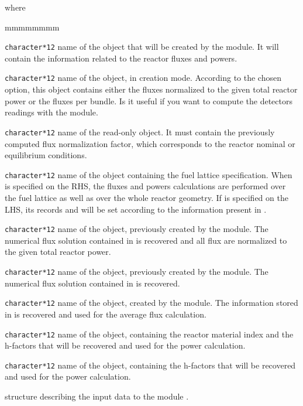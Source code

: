 \noindent where

\begin{ListeDeDescription}{mmmmmmmm}

\item[\dusa{POWER}] \texttt{character*12} name of the  object
that will be created by the module. It will contain the information related to the
reactor fluxes and powers.

\item[\dusa{NRMFLUX}] \texttt{character*12} name of the  object,
in creation mode. According to the chosen option, this object contains either 
the fluxes normalized to the given total reactor power or the fluxes per bundle. 
Is it useful if you want to compute the detectors readings with the  module.

\item[\dusa{POWOLD}] \texttt{character*12} name of the read-only 
object. It must contain the previously computed flux normalization factor, which
corresponds to the reactor nominal or equilibrium conditions.

\item[\dusa{FMAP}] \texttt{character*12} name of the  object
containing the fuel lattice specification. When  is specified on the RHS,
the fluxes and powers calculations are performed over the fuel lattice as well
as over the whole reactor geometry. If  is specified on the LHS, its
records  and  will be set according to the
information present in .

\item[\dusa{FLUX}] \texttt{character*12} name of the  object,
previously created by the  module. The numerical flux solution
contained in  is recovered and all flux are normalized to the
given total reactor power.

\item[\dusa{KINET}] \texttt{character*12} name of the  object,
previously created by the  module. The numerical flux solution
contained in  is recovered.

\item[\dusa{TRACK}] \texttt{character*12} name of the  object,
created by the  module. The information stored in 
is recovered and used for the average flux calculation.

\item[\dusa{MATEX}] \texttt{character*12} name of the  object,
containing the reactor material index and the h-factors that will be recovered
and used for the power calculation.

\item[\dusa{MACRO}] \texttt{character*12} name of the  object,
containing the h-factors that will be recovered and used for the power calculation.

\item[\dstr{descflpow}] structure describing the input data to the 
module .

\end{ListeDeDescription}

